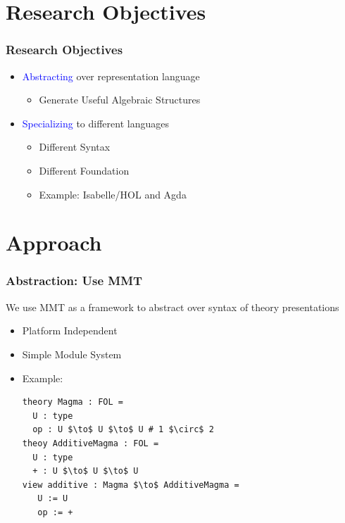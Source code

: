 \documentclass[t,12pt,numbers,fleqn,usenames,xcolor=dvipsnames]{beamer}
\begin{document}
\section{Research Objectives}
\begin{frame}
\frametitle{Research Objectives}
\begin{itemize}
	\item \textcolor{blue}{Abstracting} over representation language 
	\begin{itemize}
		\item Generate Useful Algebraic Structures 
	\end{itemize}
	\item \textcolor{blue}{Specializing} to different languages
	  \begin{itemize}
	  	\item Different Syntax
	  	\item Different Foundation 
	  	\item Example: Isabelle/HOL and Agda 
	  \end{itemize}
\end{itemize}
\end{frame}

\section{Approach}
\begin{frame}[fragile]
\frametitle{Abstraction: Use MMT}
We use MMT as a framework to abstract over syntax of theory presentations 
\begin{itemize}
	\item Platform Independent 
\pause	
	\item Simple Module System
	\item Example: 
\scriptsize	
	\begin{lstlisting}
theory Magma : FOL = 
  U : type
  op : U $\to$ U $\to$ U # 1 $\circ$ 2
theoy AdditiveMagma : FOL = 
  U : type
  + : U $\to$ U $\to$ U 
view additive : Magma $\to$ AdditiveMagma = 
   U := U 
   op := +   
	\end{lstlisting}
\end{itemize}
\end{frame}

\end{document}
